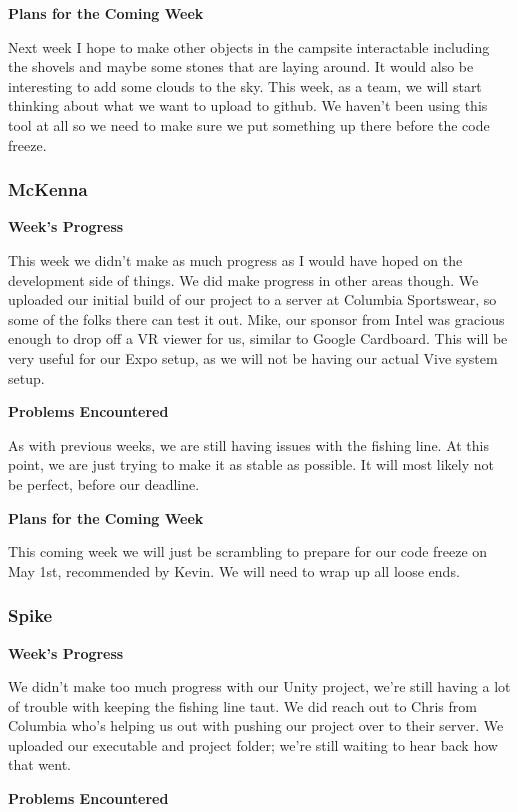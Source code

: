 \documentclass[10pt,journal,compsoc,onecolumn, draftclsnofoot]{IEEEtran}
\begin{document}
\noindent \textbf{Plans for the Coming Week}

Next week I hope to make other objects in the campsite interactable including the shovels and maybe some stones that are laying around. It would also be interesting to add some clouds to the sky. This week, as a team, we will start thinking about what we want to upload to github. We haven't been using this tool at all so we need to make sure we put something up there before the code freeze.

\subsubsection{McKenna}
\noindent \textbf{Week's Progress}

This week we didn't make as much progress as I would have hoped on the development side of things. We did make progress in other areas though. We uploaded our initial build of our project to a server at Columbia Sportswear, so some of the folks there can test it out. Mike, our sponsor from Intel was gracious enough to drop off a VR viewer for us, similar to Google Cardboard. This will be very useful for our Expo setup, as we will not be having our actual Vive system setup.

\noindent \textbf{Problems Encountered}

As with previous weeks, we are still having issues with the fishing line. At this point, we are just trying to make it as stable as possible. It will most likely not be perfect, before our deadline.

\noindent \textbf{Plans for the Coming Week}

This coming week we will just be scrambling to prepare for our code freeze on May 1st, recommended by Kevin. We will need to wrap up all loose ends.

\subsubsection{Spike}
\noindent \textbf{Week's Progress}

We didn't make too much progress with our Unity project, we're still having a lot of trouble with keeping the fishing line taut. We did reach out to Chris from Columbia who's helping us out with pushing our project over to their server. We uploaded our executable and project folder; we're still waiting to hear back how that went.

\noindent \textbf{Problems Encountered}
\end{document}
